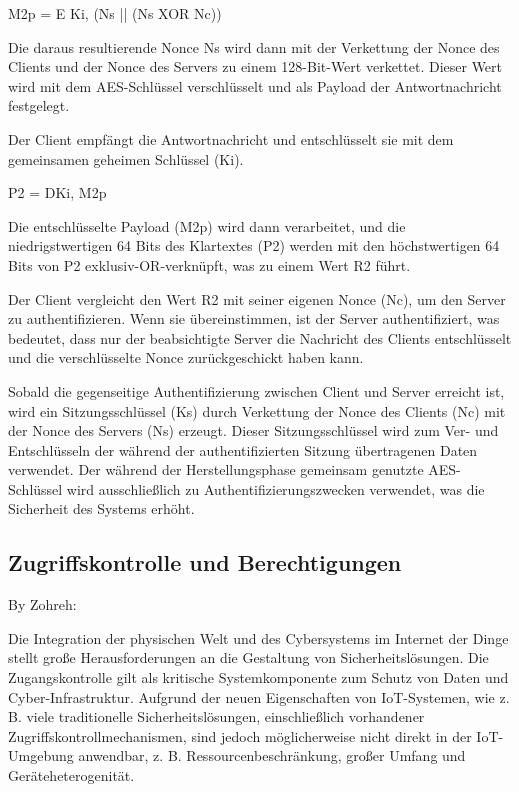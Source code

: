 M2p = E {Ki, (Ns || (Ns XOR Nc))}

Die daraus resultierende Nonce Ns wird dann mit der Verkettung der Nonce des Clients und der Nonce des Servers zu einem 128-Bit-Wert verkettet. Dieser Wert wird mit dem AES-Schlüssel verschlüsselt und als Payload der Antwortnachricht festgelegt.

Der Client empfängt die Antwortnachricht und entschlüsselt sie mit dem gemeinsamen geheimen Schlüssel (Ki).


P2 = D{Ki, M2p}

Die entschlüsselte Payload (M2p) wird dann verarbeitet, und die niedrigstwertigen 64 Bits des Klartextes (P2) werden mit den höchstwertigen 64 Bits von P2 exklusiv-OR-verknüpft, was zu einem Wert R2 führt.

Der Client vergleicht den Wert R2 mit seiner eigenen Nonce (Nc), um den Server zu authentifizieren. Wenn sie übereinstimmen, ist der Server authentifiziert, was bedeutet, dass nur der beabsichtigte Server die Nachricht des Clients entschlüsselt und die verschlüsselte Nonce zurückgeschickt haben kann.

Sobald die gegenseitige Authentifizierung zwischen Client und Server erreicht ist, wird ein Sitzungsschlüssel (Ks) durch Verkettung der Nonce des Clients (Nc) mit der Nonce des Servers (Ns) erzeugt. Dieser Sitzungsschlüssel wird zum Ver- und Entschlüsseln der während der authentifizierten Sitzung übertragenen Daten verwendet. Der während der Herstellungsphase gemeinsam genutzte AES-Schlüssel wird ausschließlich zu Authentifizierungszwecken verwendet, was die Sicherheit des Systems erhöht.




\subsection{Zugriffskontrolle und Berechtigungen}

By Zohreh:

Die Integration der physischen Welt und des Cybersystems im Internet der Dinge stellt große Herausforderungen an die Gestaltung von Sicherheitslösungen. Die Zugangskontrolle gilt als kritische Systemkomponente zum Schutz von Daten und Cyber-Infrastruktur. Aufgrund der neuen Eigenschaften von IoT-Systemen, wie z. B. viele traditionelle Sicherheitslösungen, einschließlich vorhandener Zugriffskontrollmechanismen, sind jedoch möglicherweise nicht direkt in der IoT-Umgebung anwendbar, z. B. Ressourcenbeschränkung, großer Umfang und Geräteheterogenität.\cite{8038503}\cite{ouaddah2017access}

